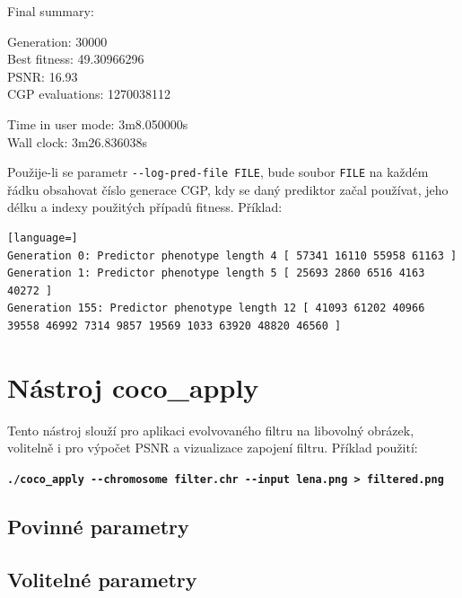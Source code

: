 {{        {\footnotesize\ttfamily{}Final summary:

        Generation: 30000 \\
        Best fitness: 49.30966296 \\
        PSNR: 16.93 \\
        CGP evaluations: 1270038112

        Time in user mode: 3m8.050000s \\
        Wall clock: 3m26.836038s}

    }
}

Použije-li se parametr \texttt{-{}-log-pred-file FILE}, bude soubor \texttt{FILE} na každém řádku obsahovat číslo generace CGP, kdy se daný prediktor začal používat, jeho délku a indexy použitých případů fitness. Příklad:

\begin{lstlisting}[language=]
Generation 0: Predictor phenotype length 4 [ 57341 16110 55958 61163 ]
Generation 1: Predictor phenotype length 5 [ 25693 2860 6516 4163 40272 ]
Generation 155: Predictor phenotype length 12 [ 41093 61202 40966 39558 46992 7314 9857 19569 1033 63920 48820 46560 ]
\end{lstlisting}

\section{Nástroj coco\_apply}

Tento nástroj slouží pro aplikaci evolvovaného filtru na libovolný obrázek, volitelně i pro výpočet PSNR a vizualizace zapojení filtru. Příklad použití:

\baselineskip
\textbf{\texttt{./coco\_apply -{}-chromosome filter.chr -{}-input lena.png > filtered.png}}

\subsection*{Povinné parametry}


\subsection*{Volitelné parametry}

